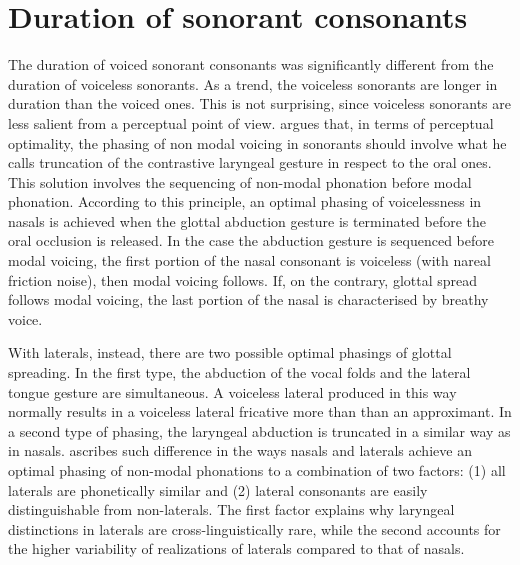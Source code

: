 \documentclass[11pt,a4paper,openany]{memoir}\usepackage[]{graphicx}\usepackage[]{color}
\begin{document}
\section{Duration of sonorant consonants}




The duration of voiced sonorant consonants was significantly different from the duration of voiceless sonorants.
As a trend, the voiceless sonorants are longer in duration than the voiced ones.
This is not surprising, since voiceless sonorants are less salient from a perceptual point of view.
\citet{silverman1997} argues that, in terms of perceptual optimality, the phasing of non modal voicing in sonorants should involve what he calls truncation of the contrastive laryngeal gesture in respect to the oral ones.
This solution involves the sequencing of non-modal phonation before modal phonation.
According to this principle, an optimal phasing of voicelessness in nasals is achieved when the glottal abduction gesture is terminated before the oral occlusion is released.
In the case the abduction gesture is sequenced before modal voicing, the first portion of the nasal consonant is voiceless (with nareal friction noise), then modal voicing follows.
If, on the contrary, glottal spread follows modal voicing, the last portion of the nasal is characterised by breathy voice.

With laterals, instead, there are two possible optimal phasings of glottal spreading.
In the first type, the abduction of the vocal folds and the lateral tongue gesture are simultaneous.
A voiceless lateral produced in this way normally results in a voiceless lateral fricative more than than an approximant.
In a second type of phasing, the laryngeal abduction is truncated in a similar way as in nasals.
\citet{silverman1997} ascribes such difference in the ways nasals and laterals achieve an optimal phasing of non-modal phonations to a combination of two factors: (1) all laterals are phonetically similar and (2) lateral consonants are easily distinguishable from non-laterals.
The first factor explains why laryngeal distinctions in laterals are cross-linguistically rare, while the second accounts for the higher variability of realizations of laterals compared to that of nasals.
\end{document}
